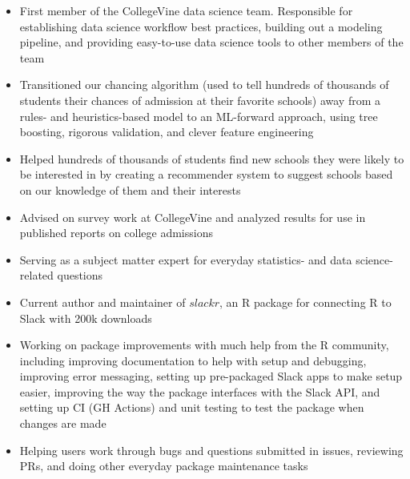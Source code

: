 \documentclass[10pt,a4paper,ragged2e,withhyper]{/Users/matt/documents/GitHub/mrkaye97.github.io/resume/altacv}
\begin{document}
	\begin{paracol}{2}
	
		\begin{itemize}
		\item First member of the CollegeVine data science team. Responsible for establishing data science workflow best practices, building out a modeling pipeline, and providing easy-to-use data science tools to other members of the team
		\item Transitioned our chancing algorithm (used to tell hundreds of thousands of students their chances of admission at their favorite schools) away from a rules- and heuristics-based model to an ML-forward approach, using tree boosting, rigorous validation, and clever feature engineering
		\item Helped hundreds of thousands of students find new schools they were likely to be interested in by creating a recommender system to suggest schools based on our knowledge of them and their interests
		\item Advised on survey work at CollegeVine and analyzed results for use in published reports on college admissions
		\item Serving as a subject matter expert for everyday statistics- and data science-related questions
		\end{itemize}
		
		\divider
		
		
		\begin{itemize}
		\item Current author and maintainer of $slackr$, an R package for connecting R to Slack with 200k downloads
		\item Working on package improvements with much help from the R community, including improving documentation to help with setup and debugging, improving error messaging, setting up pre-packaged Slack apps to make setup easier, improving the way the package interfaces with the Slack API, and setting up CI (GH Actions) and unit testing to test the package when changes are made
		\item Helping users work through bugs and questions submitted in issues, reviewing PRs, and doing other everyday package maintenance tasks
		\end{itemize}
		

\end{paracol}
\end{document}
